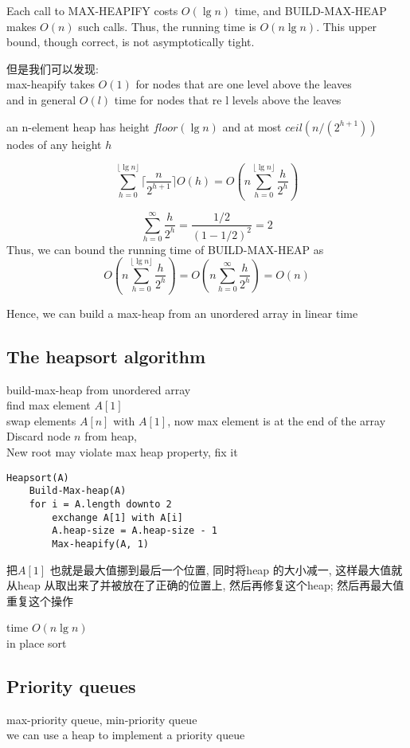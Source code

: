 \documentclass{article}
\begin{document}
Each call to MAX-HEAPIFY costs $O(\lg n)$ time, and BUILD-MAX-HEAP makes $O(n)$ such calls. Thus, the running time is $O(n\lg n )$. This upper bound, though correct, is not asymptotically tight.

但是我们可以发现:\\
max-heapify takes $O(1)$ for nodes that are one level above the leaves\\
and in general $O(l)$ time for nodes that re l levels above the leaves

an n-element heap has height $floor(\lg n )$ and at most $ceil(n/(2^{h+1}))$ nodes of any height $h$

$$
\sum_{h=0}^{\lfloor \lg n \rfloor} \lceil \frac{n}{2^{h+1}} \rceil O(h)
=
O(n \sum_{h=0}^{\lfloor \lg n \rfloor} \frac{h}{2^h})
$$

$$
\sum_{h=0}^{\infty} \frac{ h}{2^h} = \frac{1/2}{(1 - 1/2)^2} = 2
$$
Thus, we can bound the running time of BUILD-MAX-HEAP as
$$
O(n \sum_{h=0}^{\lfloor \lg n \rfloor} \frac{h}{2^h})
= O(n \sum_{h=0}^{\infty} \frac{h}{2^h})
= O(n)
$$

Hence, we can build a max-heap from an unordered array in linear time

\subsection{The heapsort algorithm}
build-max-heap from unordered array\\
find max element $A[1]$\\
swap elements $A[n]$ with $A[1]$, now max element is at the end of the array\\
Discard node $n$ from heap,\\
New root may violate max heap property, fix it

\begin{verbatim}
Heapsort(A)
    Build-Max-heap(A)
    for i = A.length downto 2
        exchange A[1] with A[i]
        A.heap-size = A.heap-size - 1
        Max-heapify(A, 1)
\end{verbatim}

把$A[1]$ 也就是最大值挪到最后一个位置, 同时将heap 的大小减一, 这样最大值就从heap 从取出来了并被放在了正确的位置上, 然后再修复这个heap; 然后再最大值重复这个操作

time $O(n\lg n )$\\
in place sort

\subsection{Priority queues}
max-priority queue, min-priority queue\\
we can use a heap to implement a priority queue
\end{document}
